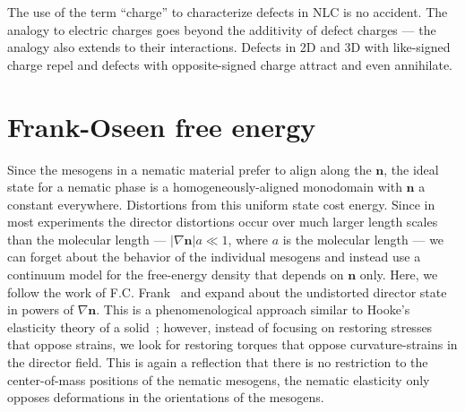 The use of the term ``charge'' to characterize defects in NLC is no accident.
The analogy to electric charges goes beyond the additivity of defect charges --- the analogy also extends to their interactions.
Defects in 2D and 3D with like-signed charge repel and defects with opposite-signed charge attract and even annihilate.




\section{Frank-Oseen free energy}
Since the mesogens in a nematic material prefer to align along the $\mathbf{n}$, the ideal state for a nematic phase is a homogeneously-aligned monodomain with $\mathbf{n}$ a constant everywhere.
Distortions from this uniform state cost energy.
Since in most experiments the director distortions occur over much larger length scales than the molecular length --- $|\nabla \mathbf{n}| a \ll 1$, where $a$ is the molecular length --- we can forget about the behavior of the individual mesogens and instead use a continuum model for the free-energy density that depends on $\mathbf{n}$ only.
Here, we follow the work of F.C. Frank~\cite{RN61} and expand about the undistorted director state in powers of $\nabla \mathbf{n}$.
This is a phenomenological approach similar to Hooke's elasticity theory of a solid~\cite{RN175,RN178}; however, instead of focusing on restoring stresses that oppose strains, we look for restoring torques that oppose curvature-strains in the director field.
This is again a reflection that there is no restriction to the center-of-mass positions of the nematic mesogens, the nematic elasticity only opposes deformations in the orientations of the mesogens.


